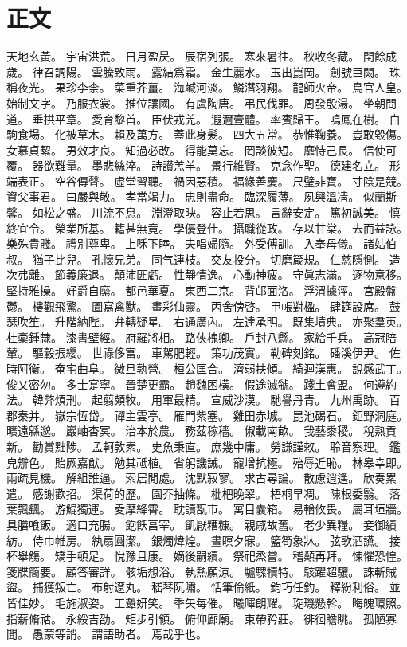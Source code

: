 \chapter{正文}%
\watermarkoff%
\thispagestyle{mychapter}%
\pagestyle{mytext}%
\ugenkoxin

天地玄黃。%
宇宙洪荒。%
日月盈昃。%
辰宿列張。%
寒來暑往。%
秋收冬藏。%
閏餘成歲。%
律召調陽。%
雲騰致雨。%
露結爲霜。%
金生麗水。%
玉出崑岡。%
劍號巨闕。%
珠稱夜光。%
果珍李柰。%
菜重芥薑。%
海鹹河淡。%
鱗潛羽翔。%
龍師火帝。%
鳥官人皇。%
始制文字。%
乃服衣裳。%
推位讓國。%
有虞陶唐。%
弔民伐罪。%
周發殷湯。%
坐朝問道。%
垂拱平章。%
愛育黎首。%
臣伏戎羌。%
遐邇壹體。%
率賓歸王。%
鳴鳳在樹。%
白駒食場。%
化被草木。%
賴及萬方。%
蓋此身髮。%
四大五常。%
恭惟鞠養。%
豈敢毀傷。%
女慕貞絜。%
男效才良。%
知過必改。%
得能莫忘。%
罔談彼短。%
靡恃己長。%
信使可覆。%
器欲難量。%
墨悲絲淬。%
詩讃羔羊。%
景行維賢。%
克念作聖。%
德建名立。%
形端表正。%
空谷傳聲。%
虛堂習聽。%
禍因惡積。%
福緣善慶。%
尺璧非寶。%
寸陰是競。%
資父事君。%
曰嚴與敬。%
孝當竭力。%
忠則盡命。%
臨深履薄。%
夙興溫凊。%
似蘭斯馨。%
如松之盛。%
川流不息。%
淵澄取映。%
容止若思。%
言辭安定。%
篤初誠美。%
慎終宜令。%
榮業所基。%
籍甚無竟。%
學優登仕。%
攝職從政。%
存以甘棠。%
去而益詠。%
樂殊貴賤。%
禮別尊卑。%
上咊下睦。%
夫唱婦隨。%
外受傅訓。%
入奉母儀。%
諸姑伯叔。%
猶子比兒。%
孔懷兄弟。%
同气連枝。%
交友投分。%
切磨箴規。%
仁慈隱惻。%
造次弗離。%
節義廉退。%
顛沛匪虧。%
性靜情逸。%
心動神疲。%
守眞志滿。%
逐物意移。%
堅持雅操。%
好爵自縻。%
都邑華夏。%
東西二京。%
背邙面洛。%
浮渭據涇。%
宮殿盤鬱。%
樓觀飛驚。%
圖寫禽獸。%
畫彩仙靈。%
丙舍傍啓。%
甲帳對楹。%
肆筵設席。%
鼓瑟吹笙。%
升階納陛。%
弁轉疑星。%
右通廣內。%
左達承明。%
既集墳典。%
亦聚羣英。%
杜稾鍾隸。%
漆書壁經。%
府羅將相。%
路俠槐卿。%
戶封八縣。%
家給千兵。%
高冠陪輦。%
驅轂振纓。%
世祿侈富。%
車駕肥輕。%
策功茂實。%
勒碑刻銘。%
磻溪伊尹。%
佐時阿衡。%
奄宅曲阜。%
微旦孰營。%
桓公匡合。%
濟弱扶傾。%
綺迴漢惠。%
說感武丁。%
俊乂密勿。%
多士寔寧。%
晉楚更霸。%
趙魏困橫。%
假途滅虢。%
踐土會盟。%
何遵約法。%
韓弊煩刑。%
起翦頗牧。%
用軍最精。%
宣威沙漠。%
馳譽丹青。%
九州禹跡。%
百郡秦并。%
嶽宗恆岱。%
禪主雲亭。%
雁門紫塞。%
雞田赤城。%
昆池碣石。%
鉅野洞庭。%
曠遠緜邈。%
巖岫杳冥。%
治本於農。%
務茲稼穡。%
俶載南畝。%
我藝黍稷。%
稅熟貢新。%
勸賞黜陟。%
孟軻敦素。%
史魚秉直。%
庶幾中庸。%
勞謙謹敕。%
聆音察理。%
鑑皃辧色。%
貽厥嘉猷。%
勉其祗植。%
省躬譏誡。%
寵增抗極。%
殆辱近恥。%
林皋幸即。%
兩疏見機。%
解組誰逼。%
索居閒處。%
沈默寂寥。%
求古尋論。%
散慮逍遙。%
欣奏累遣。%
慼謝歡招。%
渠荷的歷。%
園莽抽條。%
枇杷晚翠。%
梧桐早凋。%
陳根委翳。%
落葉飄颻。%
游鯤獨運。%
夌摩絳霄。%
耽讀翫市。%
寓目囊箱。%
易輶攸畏。%
屬耳垣牆。%
具膳喰飯。%
適口充腸。%
飽飫亯宰。%
飢厭糟糠。%
親戚故舊。%
老少異糧。%
妾御績紡。%
侍巾帷房。%
紈扇圓潔。%
銀燭煒煌。%
晝瞑夕寐。%
籃筍象牀。%
弦歌酒讌。%
接杯舉觴。%
矯手頓足。%
悅豫且康。%
嫡後嗣續。%
祭祀烝嘗。%
稽顙再拜。%
悚懼恐惶。%
箋牒簡要。%
顧答審詳。%
骸垢想浴。%
執熱願涼。%
驢騾犢特。%
駭躍超驤。%
誅斬賊盜。%
捕獲叛亡。%
布射遼丸。%
嵇琴阮嘯。%
恬筆倫紙。%
鈞巧任釣。%
釋紛利俗。%
並皆佳妙。%
毛施淑姿。%
工顰妍笑。%
秊矢每催。%
曦暉朗耀。%
琁璣懸斡。%
晦魄環照。%
指薪脩祜。%
永綏吉劭。%
矩步引領。%
俯仰廊廟。%
束帶矜莊。%
徘徊瞻眺。%
孤陋寡聞。%
愚蒙等誚。%
謂語助者。%
焉哉乎也。%
%
%

